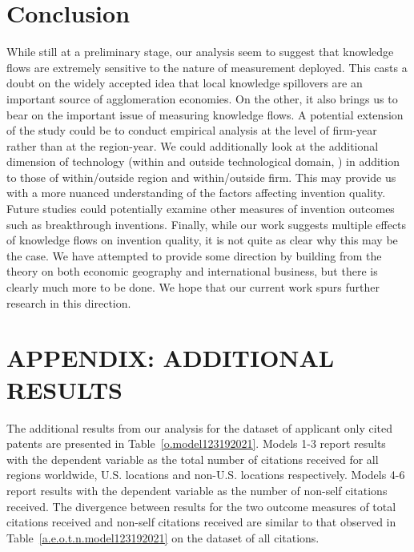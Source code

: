 \documentclass[12pt,letterpaper]{article}
\begin{document}
\section*{Conclusion}
While still at a preliminary stage, our analysis seem to suggest that knowledge flows are extremely sensitive to the nature of measurement deployed. This casts a doubt on the widely accepted idea that local knowledge spillovers are an important source of agglomeration economies. On the other, it also brings us to bear on the important issue of measuring knowledge flows. A potential extension of the study could be to conduct empirical analysis at the level of firm-year rather than at the region-year. We could additionally look at the additional dimension of technology (within and outside technological domain, \cite{Rosenkopf2001}) in addition to those of within/outside region and within/outside firm. This may provide us with a more nuanced understanding of the factors affecting invention quality. Future studies could potentially examine other measures of invention outcomes such as breakthrough inventions. Finally, while our work suggests multiple effects of knowledge flows on invention quality, it is not quite as clear why this may be the case. We have attempted to provide some direction by building from the theory on both economic geography and international business, but there is clearly much more to be done. We hope that our current work spurs further research in this direction.  

\renewcommand{\refname}{REFERENCES}
\singlespacing
 

\newpage
\normalsize
\doublespacing
\appendix

\section{APPENDIX: ADDITIONAL RESULTS}


%


%
%

The additional results from our analysis for the dataset of applicant only cited patents are presented in Table~\ref{o.model123192021}. Models 1-3 report results with the dependent variable as the total number of citations received for all regions worldwide, U.S. locations and non-U.S. locations respectively. Models 4-6 report results with the dependent variable as the number of non-self citations received. The divergence between results for the two outcome measures of total citations received and non-self citations received are similar to that observed in Table~\ref{a.e.o.t.n.model123192021} on the dataset of all citations. \par
\end{document}
